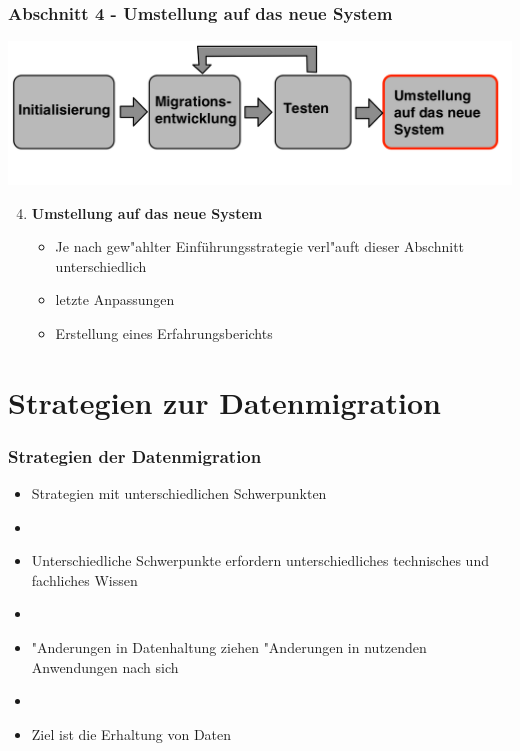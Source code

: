 \documentclass{beamer}
\begin{document}
	\begin{frame}
		\frametitle{Abschnitt 4 - Umstellung auf das neue System}
		
		\centering
		\includegraphics[width=\textwidth]{../images/prozessmodell4t.png}\\
		
		\begin{enumerate}
			\setcounter{enumi}{3}
						
			\item \textbf{Umstellung auf das neue System}
			\begin{itemize}
				\item Je nach gew"ahlter Einführungsstrategie verl"auft dieser Abschnitt unterschiedlich
				\item letzte Anpassungen
				\newline
				\item Erstellung eines Erfahrungsberichts
			\end{itemize}
			
		\end{enumerate}
	\end{frame}
	\section{Strategien zur Datenmigration}
	
	\begin{frame}
		\frametitle{Strategien der Datenmigration}
		
		\begin{itemize}
			\item Strategien mit unterschiedlichen Schwerpunkten
			\item[]
			\item Unterschiedliche Schwerpunkte erfordern unterschiedliches technisches und fachliches Wissen
			\item[]
			\item "Anderungen in Datenhaltung ziehen "Anderungen in nutzenden Anwendungen nach sich
			\item[]
			\item Ziel ist die Erhaltung von Daten
		\end{itemize}
	\end{frame}
	
\end{document}

